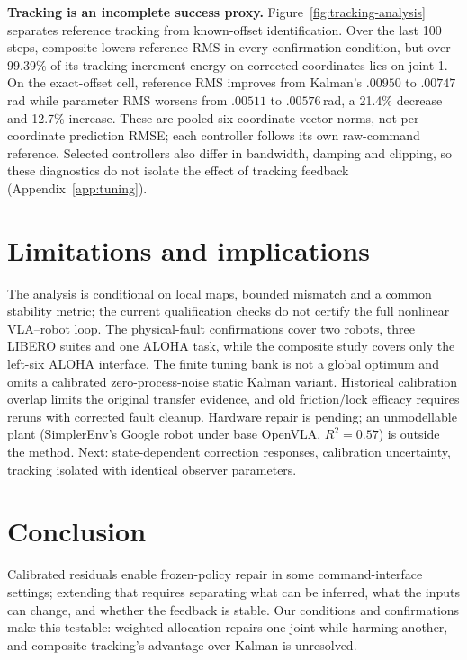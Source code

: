 \documentclass{article}
\begin{document}
\textbf{Tracking is an incomplete success proxy.} Figure~\ref{fig:tracking-analysis}
separates reference tracking from known-offset identification. Over the last 100 steps, composite lowers
reference RMS in every confirmation condition, but over 99.39\% of its tracking-increment
energy on corrected coordinates lies on joint 1. On the exact-offset cell, reference RMS improves
from Kalman's $.00950$ to $.00747$\,rad while parameter RMS worsens from $.00511$ to
$.00576$\,rad, a 21.4\% decrease and 12.7\% increase. These are pooled six-coordinate vector
norms, not per-coordinate prediction RMSE; each controller follows its own raw-command
reference. Selected controllers also differ in bandwidth, damping and clipping, so these
diagnostics do not isolate the effect of tracking feedback (Appendix~\ref{app:tuning}).

\section{Limitations and implications}
\label{sec:limits}
The analysis is conditional on local maps, bounded mismatch and a common stability metric;
the current qualification checks do not certify the full nonlinear VLA--robot loop. The
physical-fault confirmations cover two robots, three LIBERO suites and one ALOHA task, while
the composite study covers only the left-six ALOHA interface. The finite tuning bank is not
a global optimum and omits a calibrated zero-process-noise static Kalman variant. Historical
calibration overlap limits the original transfer evidence, and old friction/lock efficacy
requires reruns with corrected fault cleanup. Hardware repair is pending; an unmodellable plant
(SimplerEnv's Google robot under base OpenVLA, $R^2=0.57$) is outside the method. Next:
state-dependent correction responses, calibration uncertainty, tracking isolated with identical
observer parameters.

\section{Conclusion}
Calibrated residuals enable frozen-policy repair in some command-interface settings; extending
that requires separating what can be inferred, what the inputs can change, and whether the
feedback is stable. Our conditions and confirmations make this testable: weighted allocation
repairs one joint while harming another, and composite tracking's advantage over Kalman is unresolved.
\label{main:lastpage}

\clearpage
{}\label{backmatter:firstpage}
\end{document}
